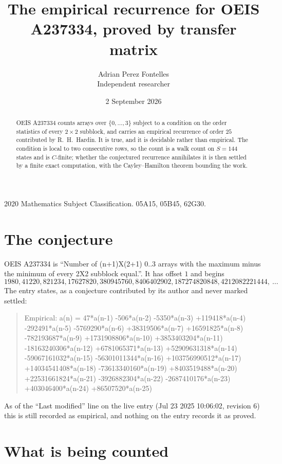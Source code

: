 \documentclass[11pt,a4paper]{article}
\title{The empirical recurrence for OEIS A237334, proved by transfer matrix}
\author{Adrian Perez Fontelles\\ \small Independent researcher}
\date{2 September 2026}
\theoremstyle{plain}
\theoremstyle{definition}
\begin{document}
\maketitle

\begin{abstract}
OEIS A237334 counts arrays over $\{0,\dots,3\}$ subject to a condition on the order
statistics of every $2\times2$ subblock, and carries an empirical recurrence of order
$25$ contributed by R.~H.~Hardin. It is true, and it is decidable rather than empirical.
The condition is local to two consecutive rows, so the count is a walk count on $S=144$
states and is $C$-finite; whether the conjectured recurrence annihilates it is then settled by
a finite exact computation, with the Cayley--Hamilton theorem bounding the work.
\end{abstract}

\noindent\small 2020 Mathematics Subject Classification. 05A15, 05B45, 62G30.\normalsize

\section{The conjecture}

OEIS A237334 is ``Number of (n+1)X(2+1) 0..3 arrays with the maximum minus the minimum of every 2X2 subblock equal.''. It has offset $1$ and begins
\[
1980, 41220, 821234, 17627820, 380945760, 8406402902, 187274820848, 4212082221444,\ \dots
\]
The entry states, as a conjecture contributed by its author and never marked settled:
\begin{quote}
Empirical: a(n) = 47*a(n-1) -506*a(n-2) -5350*a(n-3) +119418*a(n-4) -292491*a(n-5) -5769290*a(n-6) +38319506*a(n-7) +16591825*a(n-8) -782193687*a(n-9) +1731908806*a(n-10) +3853403204*a(n-11) -18163240306*a(n-12) +6781065371*a(n-13) +52909631318*a(n-14) -59067161032*a(n-15) -56301011344*a(n-16) +103756990512*a(n-17) +14034541408*a(n-18) -73613340160*a(n-19) +8403519488*a(n-20) +22531661824*a(n-21) -3926882304*a(n-22) -2687410176*a(n-23) +403046400*a(n-24) +86507520*a(n-25)
\end{quote}
As of the ``Last modified'' line on the live entry (Jul 23 2025 10:06:02, revision 6) this is still
recorded as empirical, and nothing on the entry records it as proved.

\section{What is being counted}
\end{document}
